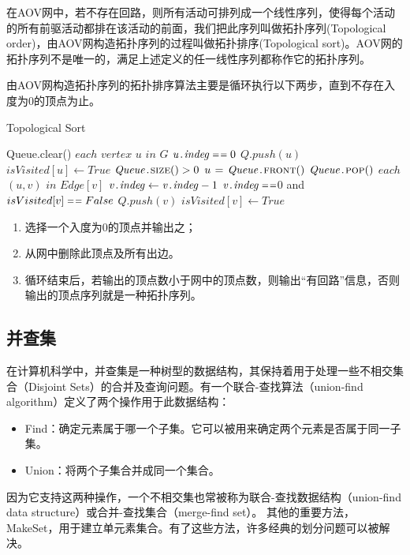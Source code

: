 在AOV网中，若不存在回路，则所有活动可排列成一个线性序列，使得每个活动的所有前驱活动都排在该活动的前面，我们把此序列叫做拓扑序列(Topological order)，由AOV网构造拓扑序列的过程叫做拓扑排序(Topological sort)。AOV网的拓扑序列不是唯一的，满足上述定义的任一线性序列都称作它的拓扑序列。

由AOV网构造拓扑序列的拓扑排序算法主要是循环执行以下两步，直到不存在入度为0的顶点为止。
\begin{algorithm} 
\caption {Topological Sort} 
\begin{codebox}
\li Queue.clear()
\li \For $each$ $vertex $ $u$ $in$ $G$
\li	\Do \If $\attribii{u}{indeg}  \isequal 0$
\li		\Then	$Q.push(u)$	
\li				$isVisited[u] \leftarrow True$
		\End
	\End
\li \While $\attribii{Queue}{\proc{size}()} > 0$
\li	\Do	$u \gets \attribii{Queue}{\proc{front}()}$
\li		$\attribii{Queue}{\proc{pop}()}$
\li		\For $each$ $(u,v)$ $in$ $ Edge[v]$
\li			\Do	$ \attribii{v}{indeg} \leftarrow  \attribii{v}{indeg} - 1$
\li			\If $\attribii{v}{indeg}  \isequal $0 and $isVisited[v] \isequal False$
\li				\Then	$Q.push(v)$
\li						$isVisited[v] \leftarrow True$
				\End
	\End
   \End
\end{codebox}
\end{algorithm} 

\begin{enumerate}
\item 选择一个入度为0的顶点并输出之；
\item 从网中删除此顶点及所有出边。
\item 循环结束后，若输出的顶点数小于网中的顶点数，则输出“有回路”信息，否则输出的顶点序列就是一种拓扑序列。
\end{enumerate}

\subsection{并查集}
在计算机科学中，并查集是一种树型的数据结构，其保持着用于处理一些不相交集合（Disjoint Sets）的合并及查询问题。有一个联合-查找算法（union-find algorithm）定义了两个操作用于此数据结构：

\begin{itemize}
\item Find：确定元素属于哪一个子集。它可以被用来确定两个元素是否属于同一子集。
\item Union：将两个子集合并成同一个集合。
\end{itemize}

因为它支持这两种操作，一个不相交集也常被称为联合-查找数据结构（union-find data structure）或合并-查找集合（merge-find set）。
其他的重要方法，MakeSet，用于建立单元素集合。有了这些方法，许多经典的划分问题可以被解决。


